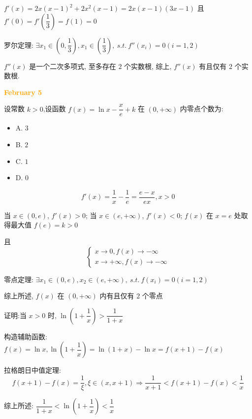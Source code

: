 \begin{solution}

	$f'(x) = 2x(x-1)^{2}+2x^{2}(x-1) = 2x(x-1)(3x-1)$ 且 $f'(0) = f'(\dfrac{1}{3}) = f(1) = 0$

	罗尔定理: $\exists x_{1}\in (0,\dfrac{1}{3}), x_{1}\in(\dfrac{1}{3}),\ s.t.\ f''(x_{i}) = 0(i = 1,2)$

	$f''(x)$ 是一个二次多项式, 至多存在 $2$ 个实数根, 综上, $f''(x)$ 有且仅有 $2$ 个实数根.
\end{solution}

\textcolor{orange}{\textbf{February 5}}

\begin{example}[][Exam: 28.1.9]
	设常数 $k>0$,设函数 $f(x)=\ln x-\dfrac{x}{e}+k$ 在 $(0,+\infty)$ 内零点个数为:
\begin{itemize}
	\item A. $3$
	\item B. $2$
	\item C. $1$
	\item D. $0$
\end{itemize}
\end{example}

\begin{solution}

	$$f'(x) = \dfrac{1}{x}-\dfrac{1}{e} = \dfrac{e-x}{ex}, x > 0$$

	当 $x\in(0,e)$, $f'(x) > 0$; 当 $x\in(e,+\infty)$, $f'(x) < 0$; $f(x)$ 在 $x = e$ 处取得最大值 $f(e) = k > 0$

	且 $$\begin{cases}
		x\to 0, f(x)\to -\infty\\
		x\to +\infty, f(x)\to -\infty
	\end{cases}$$

	零点定理: $\exists x_{1}\in(0,e),x_{2}\in(e,+\infty),\ s.t.\ f(x_{i}) = 0(i = 1,2)$

	综上所述, $f(x)$ 在 $(0,+\infty)$ 内有且仅有 $2$ 个零点
\end{solution}

\begin{example}[][Exam: 28.1.10]
	证明:当 $x>0$ 时, $\ln(1+\dfrac{1}{x})>\dfrac{1}{1+x}$
\end{example}

\begin{solution}
	
	构造辅助函数: $f(x) = \ln x, \ln(1+\dfrac{1}{x}) = \ln(1+x) -\ln x = f(x+1)-f(x)$

	拉格朗日中值定理: $$f(x+1)-f(x) = \dfrac{1}{\xi}, \xi\in(x,x+1)\Rightarrow \dfrac{1}{x+1}< f(x+1)-f(x) < \dfrac{1}{x}$$

	综上所述: $\dfrac{1}{1+x} < \ln(1+\dfrac{1}{x}) < \dfrac{1}{x}$
\end{solution}

